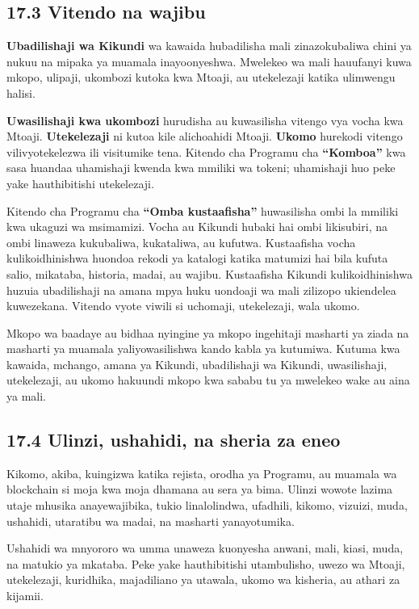 \documentclass[11pt]{article}
\begin{document}
\subsection*{17.3 Vitendo na wajibu}

\textbf{Ubadilishaji wa Kikundi} wa kawaida hubadilisha mali zinazokubaliwa chini ya nukuu na mipaka ya muamala inayoonyeshwa. Mwelekeo wa mali hauufanyi kuwa mkopo, ulipaji, ukombozi kutoka kwa Mtoaji, au utekelezaji katika ulimwengu halisi.

\textbf{Uwasilishaji kwa ukombozi} hurudisha au kuwasilisha vitengo vya vocha kwa Mtoaji. \textbf{Utekelezaji} ni kutoa kile alichoahidi Mtoaji. \textbf{Ukomo} hurekodi vitengo vilivyotekelezwa ili visitumike tena. Kitendo cha Programu cha \textbf{``Komboa''} kwa sasa huandaa uhamishaji kwenda kwa mmiliki wa tokeni; uhamishaji huo peke yake hauthibitishi utekelezaji.

Kitendo cha Programu cha \textbf{``Omba kustaafisha''} huwasilisha ombi la mmiliki kwa ukaguzi wa msimamizi. Vocha au Kikundi hubaki hai ombi likisubiri, na ombi linaweza kukubaliwa, kukataliwa, au kufutwa. Kustaafisha vocha kulikoidhinishwa huondoa rekodi ya katalogi katika matumizi hai bila kufuta salio, mikataba, historia, madai, au wajibu. Kustaafisha Kikundi kulikoidhinishwa huzuia ubadilishaji na amana mpya huku uondoaji wa mali zilizopo ukiendelea kuwezekana. Vitendo vyote viwili si uchomaji, utekelezaji, wala ukomo.

Mkopo wa baadaye au bidhaa nyingine ya mkopo ingehitaji masharti ya ziada na masharti ya muamala yaliyowasilishwa kando kabla ya kutumiwa. Kutuma kwa kawaida, mchango, amana ya Kikundi, ubadilishaji wa Kikundi, uwasilishaji, utekelezaji, au ukomo hakuundi mkopo kwa sababu tu ya mwelekeo wake au aina ya mali.

\subsection*{17.4 Ulinzi, ushahidi, na sheria za eneo}

Kikomo, akiba, kuingizwa katika rejista, orodha ya Programu, au muamala wa blockchain si moja kwa moja dhamana au sera ya bima. Ulinzi wowote lazima utaje mhusika anayewajibika, tukio linalolindwa, ufadhili, kikomo, vizuizi, muda, ushahidi, utaratibu wa madai, na masharti yanayotumika.

Ushahidi wa mnyororo wa umma unaweza kuonyesha anwani, mali, kiasi, muda, na matukio ya mkataba. Peke yake hauthibitishi utambulisho, uwezo wa Mtoaji, utekelezaji, kuridhika, majadiliano ya utawala, ukomo wa kisheria, au athari za kijamii.
\end{document}
